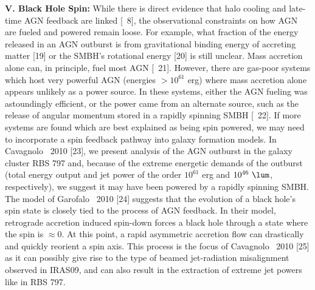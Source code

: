 \documentclass[letterpaper,11pt]{article}
\begin{document}
{\bf{V. Black Hole Spin:}} While there is direct evidence that halo
cooling and late-time AGN feedback are linked [\eg\ 8], the
observational constraints on how AGN are fueled and powered remain
loose. For example, what fraction of the energy released in an AGN
outburst is from gravitational binding energy of accreting matter [19]
or the SMBH's rotational energy [20] is still unclear. Mass accretion
alone can, in principle, fuel most AGN [\eg\ 21]. However, there are
gas-poor systems which host very powerful AGN (energies $> 10^{61}$
erg) where mass accretion alone appears unlikely as a power source. In
these systems, either the AGN fueling was astoundingly efficient, or
the power came from an alternate source, such as the release of
angular momentum stored in a rapidly spinning SMBH [\eg\ 22]. If more
systems are found which are best explained as being spin powered, we
may need to incorporate a spin feedback pathway into galaxy formation
models. In Cavagnolo \etal\ 2010 [23], we present analysis of the AGN
outburst in the galaxy cluster RBS 797 and, because of the extreme
energetic demands of the outburst (total energy output and jet power
of the order $10^{61}$ erg and $10^{46} ~\lum$, respectively), we
suggest it may have been powered by a rapidly spinning SMBH. The model
of Garofalo \etal\ 2010 [24] suggests that the evolution of a black
hole's spin state is closely tied to the process of AGN feedback. In
their model, retrograde accretion induced spin-down forces a black
hole through a state where the spin is $\approx 0$. At this point, a
rapid asymmetric accretion flow can drastically and quickly reorient a
spin axis. This process is the focus of Cavagnolo \etal\ 2010 [25] as
it can possibly give rise to the type of beamed jet-radiation
misalignment observed in IRAS09, and can also result in the extraction
of extreme jet powers like in RBS 797.
\end{document}

